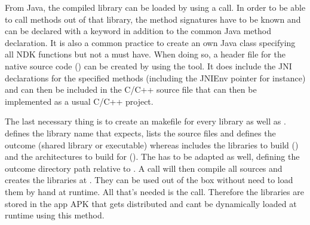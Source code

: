 From Java, the compiled library can be loaded by using a
 call. In order to be able to call methods out 
of that library, the method signatures have to be known and can be declared with 
a  keyword in addition to the common Java method declaration. It is also a 
common practice to create an own Java class specifying all NDK functions but not a must have. When doing so, a header file for the native source code () can be 
created by using the  tool. It does include the JNI declarations for the
specified methods (including the JNIEnv pointer for instance) and can then be included
in the C/C++ source file that can then be implemented as a usual C/C++ project.

The last necessary thing is to create an  makefile for every library as well as .  defines the library name that  expects, lists the source files and defines the outcome (shared library or executable) whereas  includes
the libraries to build () and the architectures to build for
(). The  has to be adapted as well, defining the
outcome directory path relative to .
A  call will then compile all sources and creates the libraries
at . They can be used out of the box without need to load them by hand
at runtime. All that's needed is the  call. Therefore the libraries
are stored in the app APK that gets distributed and cant be dynamically loaded at runtime using this method. 

